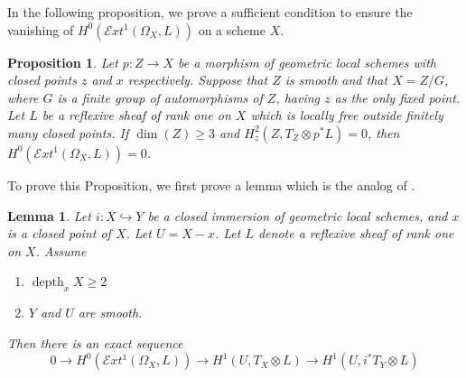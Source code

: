 \documentclass[12pt,twoside,]{amsart}
\theoremstyle{plain}
\newtheorem{lemma}[theorem]{Lemma}
\newtheorem{proposition}[theorem]{Proposition}
\theoremstyle{definition}
\begin{document}
In the following proposition, we prove a sufficient condition to ensure the vanishing of $H^0(\mathcal{E}xt^1(\Omega_X, L))$ on a scheme $X$.

\begin{proposition}\label{analog Schlessinger main}
    Let $p : Z \to X$ be a morphism of geometric local schemes with closed points $z$ and $x$ respectively. Suppose that $Z$ is smooth and that $X = Z/G$, where $G$ is a finite group of automorphisms of $Z$, having $z$ as the only fixed point. Let $L$ be a reflexive sheaf of rank one on $X$ which is locally free outside finitely many closed points. If $\operatorname{dim}(Z) \geq 3$ and $H_z^2(Z, T_Z \otimes p^*L) = 0$, then $H^0(\mathcal{E}xt^1(\Omega_X, L)) = 0$.
\end{proposition}

To prove this Proposition, we first prove a lemma which is the analog of \cite[Lemma $(2)$]{schlessinger1971}.

\begin{lemma}\label{exact sequence with coefficients in E}
  Let $i: X \hookrightarrow Y$ be a closed immersion of geometric local schemes, and $x$ is a closed point of $X$. Let $U = X -x$. Let $L$ denote a reflexive sheaf of rank one on $X$. Assume
  \begin{enumerate}
      \item $\operatorname{depth}_xX \geq 2$
      \item $Y$ and $U$ are smooth.
  \end{enumerate}
Then there is an exact sequence 
$$0 \to H^0(\mathcal{E}xt^1(\Omega_X, L)) \to H^1(U,T_X \otimes L) \to H^1(U, i^*T_Y \otimes L)$$

\end{lemma}
\end{document}
